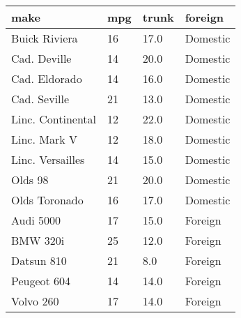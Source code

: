 \documentclass{article}
\begin{document}
\begin{table}[tbp] \centering
{}

\begin{tabularx}{\linewidth}{lCCC}

\toprule
{make}&{mpg}&{trunk}&{foreign} \tabularnewline
\midrule \addlinespace[\belowrulesep]
Buick Riviera&16&17.0&Domestic \tabularnewline
Cad. Deville&14&20.0&Domestic \tabularnewline
Cad. Eldorado&14&16.0&Domestic \tabularnewline
Cad. Seville&21&13.0&Domestic \tabularnewline
Linc. Continental&12&22.0&Domestic \tabularnewline
Linc. Mark V&12&18.0&Domestic \tabularnewline
Linc. Versailles&14&15.0&Domestic \tabularnewline
Olds 98&21&20.0&Domestic \tabularnewline
Olds Toronado&16&17.0&Domestic \tabularnewline
Audi 5000&17&15.0&Foreign \tabularnewline
BMW 320i&25&12.0&Foreign \tabularnewline
Datsun 810&21&8.0&Foreign \tabularnewline
Peugeot 604&14&14.0&Foreign \tabularnewline
Volvo 260&17&14.0&Foreign \tabularnewline
\bottomrule 

\end{tabularx}
\end{table}
\end{document}
